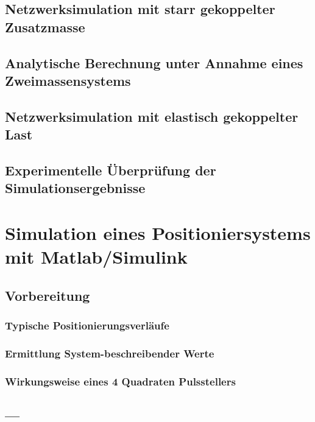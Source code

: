 \documentclass[12pt,a4paper,bibliography=totocnumbered,listof=totocnumbered]{scrartcl}
\begin{document}
\subsection{Netzwerksimulation mit starr gekoppelter Zusatzmasse}

\subsection{Analytische Berechnung unter Annahme eines Zweimassensystems}

\subsection{Netzwerksimulation mit elastisch gekoppelter Last}

\subsection{Experimentelle Überprüfung der Simulationsergebnisse}


\pagebreak
\pagebreak{}
\section{Simulation eines Positioniersystems mit Matlab/Simulink}

\subsection{Vorbereitung}

\subsubsection{Typische Positionierungsverläufe}

\subsubsection{Ermittlung System-beschreibender Werte}

\subsubsection{Wirkungsweise eines 4 Quadraten Pulsstellers}

\subsection{ --- }
\end{document}
